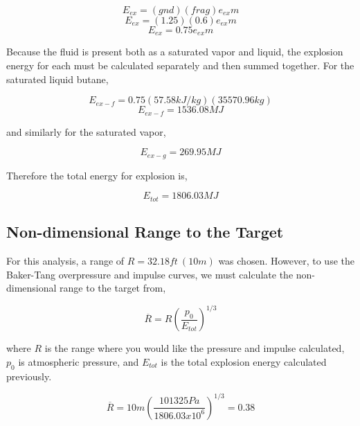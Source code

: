 \documentclass[10pt,parskip=half,
toc=sectionentrywithdots,
bibliography=totocnumbered,
captions=tableheading,numbers=noendperiod]{scrartcl}
\begin{document}
\begin{equation}E_{ex}=(gnd)(frag)e_{ex}m\end{equation}
\begin{equation}E_{ex}=(1.25)(0.6)e_{ex}m\end{equation}
\begin{equation}E_{ex}=0.75e_{ex}m\end{equation}

Because the fluid is present both as a saturated vapor and liquid, the
explosion energy for each must be calculated separately and then summed
together. For the saturated liquid butane,

\begin{equation}E_{ex-f}=0.75(57.58kJ/kg)(35570.96kg)\end{equation}
\begin{equation}E_{ex-f}=1536.08MJ\end{equation}

and similarly for the saturated vapor,

\begin{equation}E_{ex-g}=269.95MJ\end{equation}

Therefore the total energy for explosion is,

\begin{equation}E_{tot} = 1806.03MJ\end{equation}

\hypertarget{non-dimensional-range-to-the-target}{%
\subsection{Non-dimensional Range to the
Target}\label{non-dimensional-range-to-the-target}}

For this analysis, a range of \(R= 32.18ft\:(10m)\) was chosen. However,
to use the Baker-Tang overpressure and impulse curves, we must calculate
the non-dimensional range to the target from\cite{Safety2010},

\begin{equation}\overline{R} = R\left(\frac{p_0}{E_{tot}}\right)^{1/3}\end{equation}

where \(R\) is the range where you would like the pressure and impulse
calculated, \(p_0\) is atmospheric pressure, and \(E_{tot}\) is the
total explosion energy calculated previously.

\begin{equation}\overline{R} = 10m\left(\frac{101325Pa}{1806.03x10^6}\right)^{1/3} = 0.38\end{equation}
\end{document}
